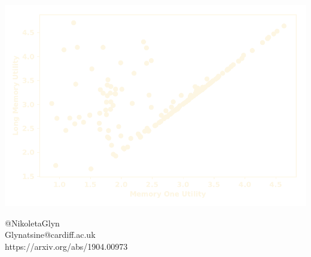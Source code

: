 \documentclass{beamer}
\begin{document}
\begin{frame}
    \begin{center}
        \hspace{-2cm}
        
    \end{center}
\end{frame}

\begin{frame}
    \begin{center}
        \vspace{-1cm}
        \includegraphics[width=\textwidth]{static/result_gambler}
    \end{center}
\end{frame}

\begin{frame}
    \begin{center}

        \hspace{-.7cm}
        

        \vspace{.4cm}
        @NikoletaGlyn  \\ Glynatsine@cardiff.ac.uk \\

        \vspace{.3cm}
        \small{https://arxiv.org/abs/1904.00973}
    \end{center}
\end{frame}
\end{document}
